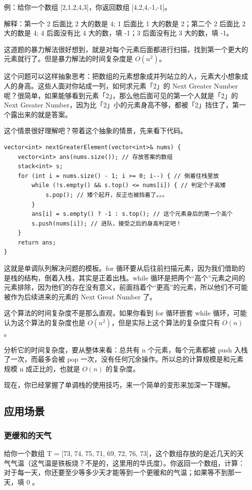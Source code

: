 \documentclass[12pt]{article}
\begin{document}
例：给你一个数组 [2,1,2,4,3]，你返回数组 [4,2,4,-1,-1]。

解释：第一个 2 后面比 2 大的数是 4; 1 后面比 1 大的数是 2；第二个 2 后面比 2 大的数是 4; 4 后面没有比 4 大的数，填 -1；3 后面没有比 3 大的数，填 -1。

这道题的暴力解法很好想到，就是对每个元素后面都进行扫描，找到第一个更大的元素就行了。但是暴力解法的时间复杂度是 $O(n^2)$。

这个问题可以这样抽象思考：把数组的元素想象成并列站立的人，元素大小想象成人的身高。这些人面对你站成一列，如何求元素「2」的 Next Greater Number 呢？很简单，如果能够看到元素「2」，那么他后面可见的第一个人就是「2」的 Next Greater Number，因为比「2」小的元素身高不够，都被「2」挡住了，第一个露出来的就是答案。

这个情景很好理解吧？带着这个抽象的情景，先来看下代码。
\begin{lstlisting}
vector<int> nextGreaterElement(vector<int>& nums) {
    vector<int> ans(nums.size()); // 存放答案的数组
    stack<int> s;
    for (int i = nums.size() - 1; i >= 0; i--) { // 倒着往栈里放
        while (!s.empty() && s.top() <= nums[i]) { // 判定个子高矮
            s.pop(); // 矮个起开，反正也被挡着了。。。
        }
        ans[i] = s.empty() ? -1 : s.top(); // 这个元素身后的第一个高个
        s.push(nums[i]); // 进队，接受之后的身高判定吧！
    }
    return ans;
}
\end{lstlisting}

这就是单调队列解决问题的模板。for 循环要从后往前扫描元素，因为我们借助的是栈的结构，倒着入栈，其实是正着出栈。while 循环是把两个“高个”元素之间的元素排除，因为他们的存在没有意义，前面挡着个“更高”的元素，所以他们不可能被作为后续进来的元素的 Next Great Number 了。

这个算法的时间复杂度不是那么直观，如果你看到 for 循环嵌套 while 循环，可能认为这个算法的复杂度也是 $O(n^2)$，但是实际上这个算法的复杂度只有 $O(n)$。

分析它的时间复杂度，要从整体来看：总共有 n 个元素，每个元素都被 push 入栈了一次，而最多会被 pop 一次，没有任何冗余操作。所以总的计算规模是和元素规模 n 成正比的，也就是 $O(n)$ 的复杂度。

现在，你已经掌握了单调栈的使用技巧，来一个简单的变形来加深一下理解。

\subsection{应用场景}
\subsubsection{更缓和的天气}
给你一个数组 T = [73, 74, 75, 71, 69, 72, 76, 73]，这个数组存放的是近几天的天气气温（这气温是铁板烧？不是的，这里用的华氏度）。你返回一个数组，计算：对于每一天，你还要至少等多少天才能等到一个更暖和的气温；如果等不到那一天，填 0 。
\end{document}
